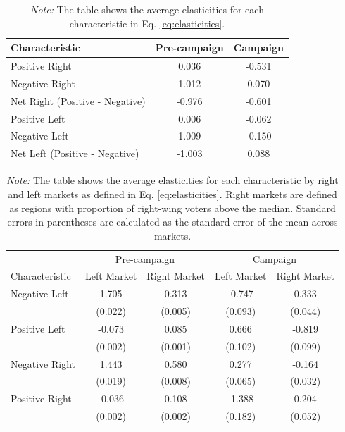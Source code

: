 \documentclass[12pt]{article}
\begin{document}
\begin{table}[!htb]
	\centering
	\caption{Estimated Elasticities}
	\begin{tabular}{lcc}
		\toprule
		Characteristic & \textbf{Pre-campaign}& \textbf{Campaign} \\
		\midrule
		Positive Right & 0.036 & -0.531 \\
		Negative Right & 1.012 & 0.070 \\
		Net Right (Positive - Negative) & -0.976 & -0.601 \\
		\hline
		Positive Left & 0.006 & -0.062 \\
		Negative Left & 1.009 & -0.150 \\
		Net Left (Positive - Negative) & -1.003 & 0.088 \\
		\bottomrule
	\end{tabular}
	\caption*{\textit{Note:} \small The table shows the average elasticities for each characteristic in Eq. \eqref{eq:elasticities}. }
	\label{tab:elasticities0}
\end{table}





\begin{table}[!htb]
	\centering
	\caption{Estimated Elasticities for Right and Left Markets}
	\begin{tabular}{l|cc|cc}
		\toprule
		& \multicolumn{2}{c|}{Pre-campaign} & \multicolumn{2}{c}{Campaign} \\
		Characteristic & Left Market & Right Market & Left Market & Right Market \\
		\midrule
		Negative Left & 1.705 & 0.313 & -0.747 & 0.333 \\
		& (0.022) & (0.005) & (0.093) & (0.044) \\
		Positive Left & -0.073 & 0.085 & 0.666 & -0.819 \\
		& (0.002) & (0.001) & (0.102) & (0.099) \\
		Negative Right & 1.443 & 0.580 & 0.277 & -0.164 \\
		& (0.019) & (0.008) & (0.065) & (0.032) \\
		Positive Right & -0.036 & 0.108 & -1.388 & 0.204 \\
		& (0.002) & (0.002) & (0.182) & (0.052) \\
		\bottomrule
	\end{tabular}
	\caption*{\textit{Note:} \small The table shows the average elasticities for each characteristic by right and left markets as defined in Eq. \eqref{eq:elasticities}. Right markets are defined as regions with proportion of right-wing voters above the median. Standard errors in parentheses are calculated as the standard error of the mean across markets.}
	\label{tab:elasticities}
\end{table}
 
\end{document}
